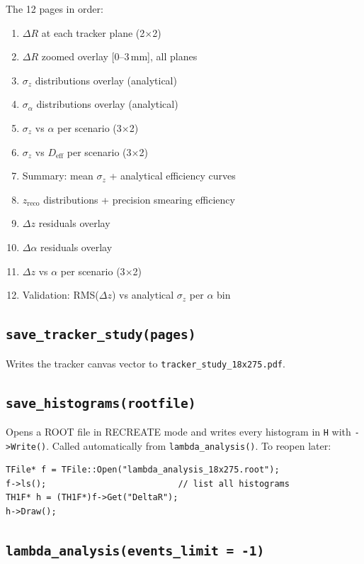\documentclass[11pt]{article}
\begin{document}
The 12 pages in order:
\begin{enumerate}
  \item $\Delta R$ at each tracker plane (2$\times$2)
  \item $\Delta R$ zoomed overlay [0--3\,mm], all planes
  \item $\sigma_z$ distributions overlay (analytical)
  \item $\sigma_\alpha$ distributions overlay (analytical)
  \item $\sigma_z$ vs $\alpha$ per scenario (3$\times$2)
  \item $\sigma_z$ vs $D_\text{eff}$ per scenario (3$\times$2)
  \item Summary: mean $\sigma_z$ + analytical efficiency curves
  \item $z_\text{reco}$ distributions + precision smearing efficiency
  \item $\Delta z$ residuals overlay
  \item $\Delta\alpha$ residuals overlay
  \item $\Delta z$ vs $\alpha$ per scenario (3$\times$2)
  \item Validation: RMS($\Delta z$) vs analytical $\sigma_z$ per $\alpha$ bin
\end{enumerate}

\subsection{\texttt{save\_tracker\_study(pages)}}

Writes the tracker canvas vector to \texttt{tracker\_study\_18x275.pdf}.

\subsection{\texttt{save\_histograms(rootfile)}}

Opens a ROOT file in RECREATE mode and writes every histogram in
\texttt{H} with \texttt{->Write()}. Called automatically from
\texttt{lambda\_analysis()}. To reopen later:
\begin{lstlisting}
TFile* f = TFile::Open("lambda_analysis_18x275.root");
f->ls();                          // list all histograms
TH1F* h = (TH1F*)f->Get("DeltaR");
h->Draw();
\end{lstlisting}

\subsection{\texttt{lambda\_analysis(events\_limit = -1)}}
\end{document}
